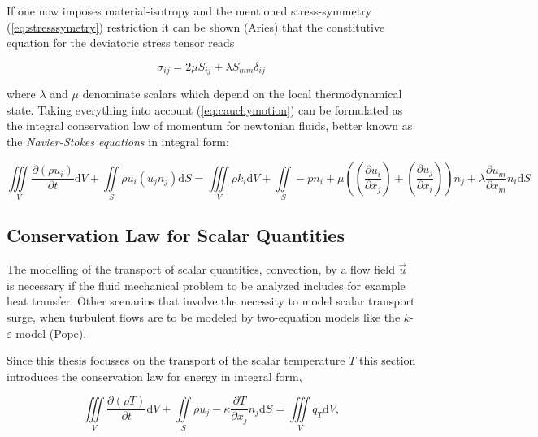     If one now imposes material-isotropy and the mentioned stress-symmetry (\ref{eq:stresssymetry}) restriction it can be shown (Aries) that the constitutive equation for the deviatoric stress tensor reads 

    \begin{displaymath}
      \sigma_{ij} = 2 \mu S_{ij} + \lambda S_{mm} \delta_{ij}
    \end{displaymath}

    where \(\lambda\) and \(\mu\) denominate scalars which depend on the local thermodynamical state. Taking everything into account (\ref{eq:cauchymotion}) can be formulated as the integral conservation law of momentum for newtonian fluids, better known as the \textit{Navier-Stokes equations} in integral form:

    \begin{equation}
      \iiint\limits_V \frac{\partial \left(\rho u_i \right)}{\partial t} \mathrm{d}V 
      + \iint\limits_S \rho u_i \left( u_j n_j \right) \mathrm{d}S 
      = \iiint\limits_V \rho k_i \mathrm{d}V 
      + \iint\limits_S -p n_i 
      + \mu \left( \left( \frac{\partial u_i}{\partial x_j} \right) + \left( \frac{\partial u_j}{\partial x_i} \right) \right) n_j 
      + \lambda \frac{\partial u_m}{\partial x_m} n_i
      \mathrm{d}S
    \end{equation}

    \subsection{Conservation Law for Scalar Quantities}

    The modelling of the transport of scalar quantities, convection, by a flow field \(\vec{u}\) is necessary if the fluid mechanical problem to be analyzed includes for example heat transfer. Other scenarios that involve the necessity to model scalar transport surge, when turbulent flows are to be modeled by two-equation models like the \(k\)-\(\varepsilon\)-model (Pope). 
    
    Since this thesis focusses on the transport of the scalar temperature \(T\) this section introduces the conservation law for energy in integral form,

    \begin{equation}
      \iiint\limits_V \frac{\partial \left(\rho T \right)}{\partial t}\mathrm{d}V + \iint\limits_S \rho u_j - \kappa \frac{\partial T}{\partial x_j} n_j \mathrm{d}S= \iiint\limits_V  q_T \mathrm{d}V,
    \end{equation}

